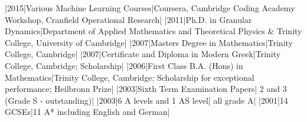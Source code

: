 \documentclass[a4paper,10pt]{article}
\begin{document}
  

\begin{cvsection}[Education]
|2015|Various Machine Learning Courses|Coursera, Cambridge Coding Academy Workshop, Cranfield Operational Research|
|2011|Ph.D. in Granular Dynamics|Department of Applied Mathematics and Theoretical Physics \& Trinity College, University of Cambridge|
|2007|Masters Degree in Mathematics|Trinity College, Cambridge|
|2007|Certificate and Diploma in Modern Greek|Trinity College, Cambridge;
Scholarship|
|2006|First Class B.A. (Hons) in Mathematics|Trinity College, Cambridge;
Scholarship for exceptional performance; Heilbronn Prize|
|2003|Sixth Term Examination Papers| 2 and 3 (Grade S - outstanding)|
|2003|6 A levels and 1 AS level| all grade A|
|2001|14 GCSEs|11 A* including English and German|
\end{cvsection}

\end{document}
